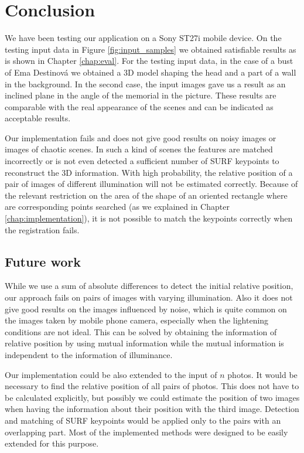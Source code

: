 \chapter*{Conclusion}

We have been testing our application on a Sony ST27i mobile device.
On the testing input data in Figure \ref{fig:input_samples} we obtained satisfiable results as is shown in Chapter \ref{chap:eval}.
For the testing input data, in the case of a bust of Ema Destinová we obtained a 3D model shaping the head and a part of a wall in the background.
In the second case, the input images gave us a result as an inclined plane in the angle of the memorial in the picture.
These results are comparable with the real appearance of the scenes and can be indicated as acceptable results.

Our implementation fails and does not give good results on noisy images or images of chaotic scenes.
In such a kind of scenes the features are matched incorrectly or is not even detected a sufficient number of SURF keypoints to reconstruct the 3D information. 
With high probability, the relative position of a pair of images of different illumination will not be estimated correctly.
Because of the relevant restriction on the area of the shape of an oriented rectangle where are corresponding points searched (as we explained in Chapter \ref{chap:implementation}),
it is not possible to match the keypoints correctly when the registration fails.

\section*{Future work}

While we use a sum of absolute differences to detect the initial relative position, our approach fails on pairs of images with varying illumination.
Also it does not give good results on the images influenced by noise, which is quite common on the images taken by mobile phone camera, 
especially when the lightening conditions are not ideal.
This can be solved by obtaining the information of relative position by using mutual information while the mutual information is independent to the information of illuminance.

Our implementation could be also extended to the input of $n$ photos. 
It would be necessary to find the relative position of all pairs of photos.
This does not have to be calculated explicitly, but possibly we could estimate the position of two images when having the information about their position with the third image.
Detection and matching of SURF keypoints would be applied only to the pairs with an overlapping part.
Most of the implemented methods were designed to be easily extended for this purpose.

